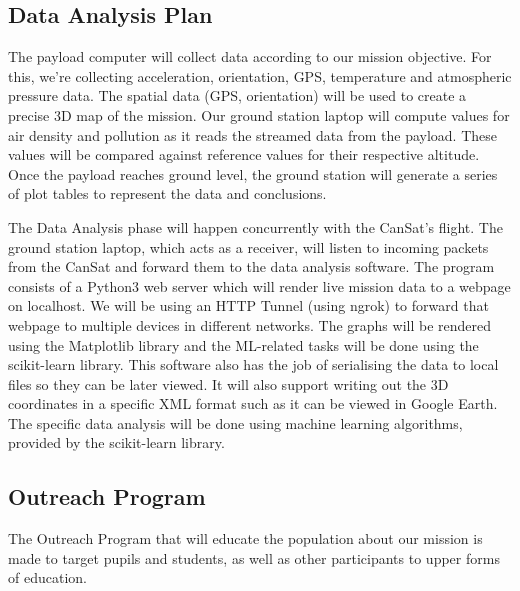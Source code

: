 \subsection{Data Analysis Plan}

The payload computer will collect data according to our mission objective. For this, we're collecting acceleration, orientation, GPS, temperature and atmospheric pressure data. The spatial data (GPS, orientation) will be used to create a precise 3D map of the mission. Our ground station laptop will compute values for air density and pollution as it reads the streamed data from the payload. These values will be compared against reference values for their respective altitude. Once the payload reaches ground level, the ground station will generate a series of plot tables to represent the data and conclusions. 

The Data Analysis phase will happen concurrently with the CanSat’s flight. The ground station laptop, which acts as a receiver, will listen to incoming packets from the CanSat and forward them to the data analysis software. The program consists of a Python3 web server which will render live mission data to a webpage on localhost. We will be using an HTTP Tunnel (using ngrok) to forward that webpage to multiple devices in different networks. The graphs will be rendered using the Matplotlib library and the ML-related tasks will be done using the scikit-learn library. This software also has the job of serialising the data to local files so they can be later viewed. It will also support writing out the 3D coordinates in a specific XML format such as it can be viewed in Google Earth. The specific data analysis will be done using machine learning algorithms, provided by the scikit-learn library.

\subsection{Outreach Program}

The Outreach Program that will educate the population about our mission is made to target pupils and students, as well as other participants to upper forms of education. 


